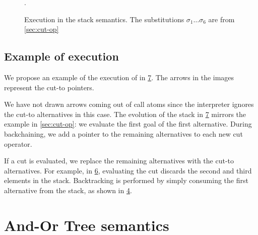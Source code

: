 \documentclass[sigplan,10pt,anonymous,review]{acmart}
\begin{document}
\begin{figure}[!htb]
  \begin{subfigure}{0pt}\label{ex-elpi0}\end{subfigure}%
  \begin{subfigure}{0pt}\label{ex-elpi1}\end{subfigure}%
  \begin{subfigure}{0pt}\label{ex-elpi2}\end{subfigure}%
  \begin{subfigure}{0pt}\label{ex-elpi3}\end{subfigure}%
  \begin{subfigure}{0pt}\label{ex-elpi4}\end{subfigure}%
  \begin{subfigure}{0pt}\label{ex-elpi5}\end{subfigure}%
  \caption{Execution in the stack semantics. 
  The substitutions $\sigma_1\dots\sigma_6$ are from \cref{sec:cut-op}}.
  \label{ex-elpi}
\end{figure}
\subsection{Example of execution}

We propose an example of the execution of \nur in \cref{ex-elpi}. The
arrows in the images represent the cut-to pointers.

We have not drawn arrows coming out of call atoms since the interpreter
ignores the cut-to alternatives in this case.
The evolution
of the stack in \cref{ex-elpi} mirrors the example in \cref{sec:cut-op}:
we evaluate the first goal of the first alternative. 
During backchaining,
we add a pointer to the remaining alternatives to each new cut operator.

If a cut is evaluated, we replace the remaining alternatives with the
cut-to alternatives. For example, in \cref{ex-elpi5}, evaluating the cut
discards the second and third elements in the stack. Backtracking is
performed by simply consuming the first alternative from the stack, as shown
in \cref{ex-elpi3}.


\section{And-Or Tree semantics}
\label{tree-sem}
\end{document}
